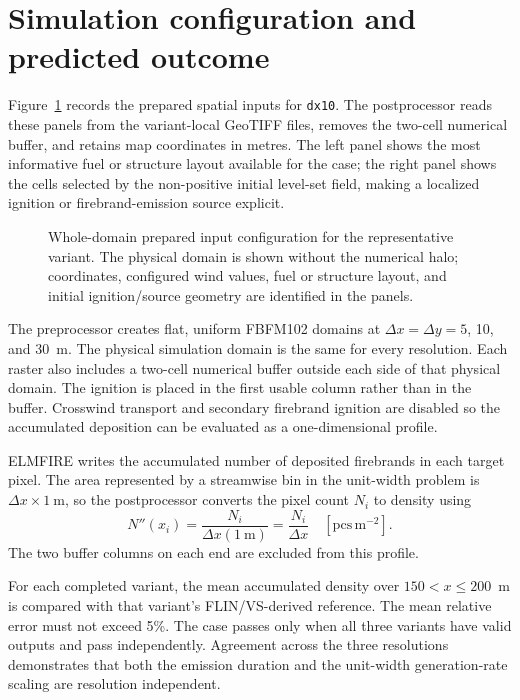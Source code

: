 \section{Simulation configuration and predicted outcome}

Figure~\ref{fig:input-configuration} records the prepared spatial inputs for \texttt{dx10}.
The postprocessor reads these panels from the variant-local GeoTIFF files, removes the
two-cell numerical buffer, and retains map coordinates in metres.  The left panel shows
the most informative fuel or structure layout available for the case; the right panel
shows the cells selected by the non-positive initial level-set field, making a localized
ignition or firebrand-emission source explicit.

\begin{figure}[H]
\centering
{}
\caption{Whole-domain prepared input configuration for the representative variant.  The
physical domain is shown without the numerical halo; coordinates, configured wind values,
fuel or structure layout, and initial ignition/source geometry are identified in the panels.}
\label{fig:input-configuration}
\end{figure}

The preprocessor creates flat, uniform FBFM102 domains at
$\Delta x=\Delta y=5$, 10, and 30~m. The physical simulation domain is the
same for every resolution. Each raster also includes a two-cell numerical
buffer outside each side of that physical domain. The ignition is placed in
the first usable column rather than in the buffer. Crosswind transport and
secondary firebrand ignition are disabled so the accumulated deposition can
be evaluated as a one-dimensional profile.

ELMFIRE writes the accumulated number of deposited firebrands in each target
pixel. The area represented by a streamwise bin in the unit-width problem is
$\Delta x\times1~\mathrm{m}$, so the postprocessor converts the pixel count
$N_i$ to density using
\[
  N''(x_i)=\frac{N_i}{\Delta x(1~\mathrm{m})}
  =\frac{N_i}{\Delta x}
  \quad [\mathrm{pcs\,m^{-2}}].
\]
The two buffer columns on each end are excluded from this profile.


For each completed variant, the mean accumulated density over
$150<x\leq200$~m is compared with that variant's FLIN/VS-derived reference.
The mean relative error must not exceed 5\%. The case passes only when all
three variants have valid outputs and pass independently. Agreement across the
three resolutions demonstrates that both the emission duration and the
unit-width generation-rate scaling are resolution independent.

